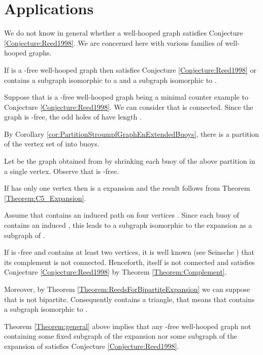 \documentclass{amsart}
\theoremstyle{definition}
\theoremstyle{remark}
\newenvironment{prf}{{\bf \noindent Proof. } }{\hfill\\}
\newcommand{\wh}{well-hooped\xspace}
\newcommand{\extB}{buoy\xspace}
\newcommand{\extBs}{buoys\xspace}
\begin{document}
\section{Applications}

We do not know in general whether a \wh graph  satisfies Conjecture \ref{Conjecture:Reed1998}. 
We are concerned here with various families of \wh graphs.






\begin{thm} \label{Theorem:general} If  is a -free \wh graph then  satisfies Conjecture \ref{Conjecture:Reed1998} 
or  contains a subgraph isomorphic to a  and a subgraph isomorphic to .
\end{thm}
\begin{prf}



Suppose that  is  a -free \wh graph being a minimal counter example to Conjecture \ref{Conjecture:Reed1998}.
We can consider that  is connected. Since the graph is -free, the odd holes of  have length . 

By Corollary \ref{cor:PartitionStroumpfGraphEnExtendedBuoys}, there is a partition of the vertex set of  into \extBs. 

Let  be the graph obtained from  by shrinking each buoy of the above partition in a single vertex. Observe that  is -free.

If  has only one vertex then  is a  expansion and the result follows from Theorem \ref{Theorem:C5_Expansion}.

Assume that  contains an induced path on four vertices . Since each \extB of  contains an induced , this  leads to a subgraph isomorphic to the expansion
 as a subgraph of . 

If  is -free and contains at least two vertices, it is well known (see Seinsche \cite{Sei1974}) that its complement
is not connected.  Henceforth,  itself is not connected and  satisfies Conjecture \ref{Conjecture:Reed1998} by Theorem \ref{Theorem:Complement}.

Moreover, by Theorem \ref{Theorem:ReedsForBipartiteExpansion} we can suppose that  is not bipartite. Consequently  contains a triangle, that means that  contains a subgraph isomorphic to .
\end{prf}



Theorem \ref{Theorem:general} above implies that any -free \wh graph   not containing some fixed subgraph of the expansion 
 nor some subgraph of the expansion of  satisfies Conjecture \ref{Conjecture:Reed1998}.
\end{document}
